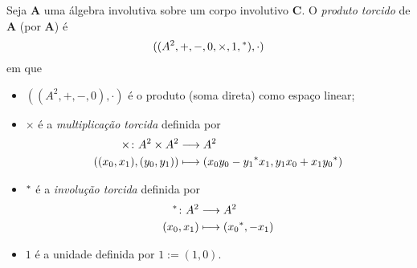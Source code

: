 \begin{definition}
Seja $\bm A$ uma álgebra involutiva sobre um corpo involutivo $\bm C$. O \emph{produto torcido} de $\bm A$ (por $\bm A$) é
	\begin{equation*}
	((A^2,+,-,0,\times,1,{}^*),\cdot)
	\end{equation*}
em que
	\begin{itemize}
	\item $((A^2,+,-,0),\cdot)$ é o produto (soma direta) como espaço linear;
	\item $\times$ é a \emph{multiplicação torcida} definida por
		\begin{align*}
		{\times}\colon {A^2 \times A^2} &\longrightarrow {A^2} \\{((x_0,x_1), (y_0,y_1))} &\longmapsto (x_0y_0-{y_1}^*x_1, y_1x_0 + x_1{y_0}^*)
		\end{align*}
	\item ${}^*$ é a \emph{involução torcida} definida por
		\begin{align*}
		{{}^*}\colon {A^2} &\longrightarrow {A^2} \\{(x_0,x_1)} &\longmapsto ({x_0}^*,-x_1)
		\end{align*}
	\item $1$ é a unidade definida por $1 := (1,0)$.
	\end{itemize}
\end{definition}

